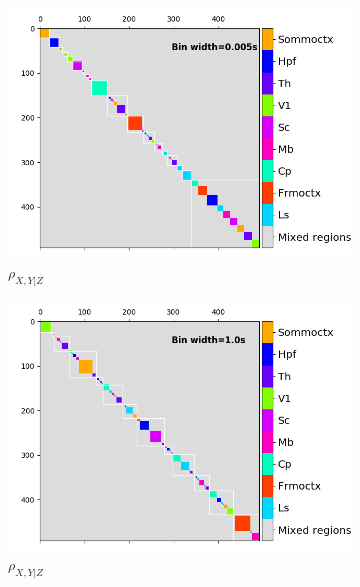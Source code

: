   \begin{figure}[h]
    \begin{subfigure}[h]{0.5\linewidth}
      \includegraphics[width=\linewidth]{figures/eight_probe/Krebs_0p005_conditional_rectified_regional_cluster_map.png}
      \caption{$\rho_{X,Y|Z}$}
      \label{fig:short_time_conditional_rectified_regional_clusters}
    \end{subfigure}
    \begin{subfigure}[h]{0.5\linewidth}
      \includegraphics[width=\linewidth]{figures/eight_probe/Krebs_1p0_conditional_rectified_regional_cluster_map.png}
      \caption{$\rho_{X,Y|Z}$}
      \label{fig:long_time_conditional_rectified_regional_clusters}
    \end{subfigure}
    \begin{subfigure}[h]{0.5\linewidth}

\end{subfigure}
\end{figure}
